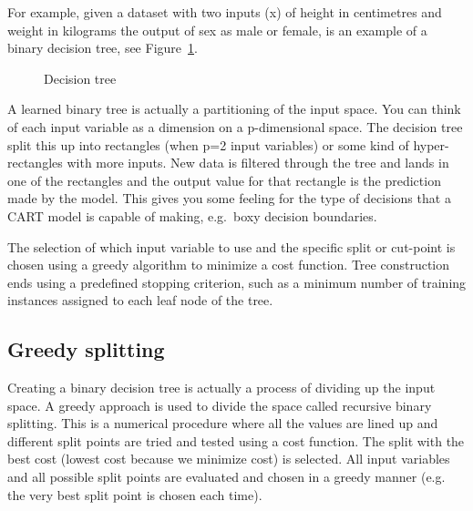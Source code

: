 \documentclass{book}
\begin{document}
For example, given a dataset with two inputs (x) of height in centimetres and weight in kilograms the output of sex as male or female, is an example of a binary decision tree, see Figure~\ref{fig:decisiontree}.
\begin{figure}
\centering
{}
\caption{Decision tree}
\label{fig:decisiontree}
\end{figure}
A learned binary tree is actually a partitioning of the input space. You can think of each input variable as a dimension on a p-dimensional space. The decision tree split this up into rectangles (when p=2 input variables) or some kind of hyper-rectangles with more inputs.
New data is filtered through the tree and lands in one of the rectangles and the output value for that rectangle is the prediction made by the model. This gives you some feeling for the type of decisions that a CART model is capable of making, e.g.\ boxy decision boundaries.


The selection of which input variable to use and the specific split or cut-point is chosen using a greedy algorithm to minimize a cost function. Tree construction ends using a predefined stopping criterion, such as a minimum number of training instances assigned to each leaf node of the tree.


\subsection{Greedy splitting}
Creating a binary decision tree is actually a process of dividing up the input space. A greedy approach is used to divide the space called recursive binary splitting. This is a numerical procedure where all the values are lined up and different split points are tried and tested using a cost function. The split with the best cost (lowest cost because we minimize cost) is selected. All input variables and all possible split points are evaluated and chosen in a greedy manner (e.g. the very best split point is chosen each time).
\end{document}
